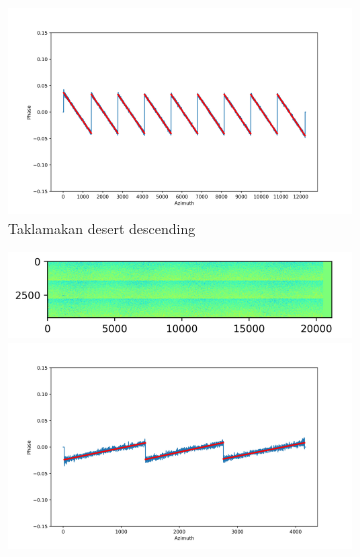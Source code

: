 \documentclass[preprint, authoryear]{elsarticle}
\begin{document}
\begin{figure}
\begin{subfigure}[c]{0.5\textwidth}
\begin{minipage}[c]{0.5\textwidth}
        \end{minipage}%
        \begin{minipage}[c]{0.5\textwidth}
            \centering
            \includegraphics[width=\textwidth]{figure/The cross-interferogram/cross_interf_TaklimakanDesert_des_row&fitted_20230108.png}
        \end{minipage}
        \caption{Taklamakan desert descending}
        \label{fig_5b}
    \end{subfigure}%
    \hfill
    \begin{subfigure}{0.5\textwidth}
        \centering
        \begin{minipage}{0.5\textwidth}
            \centering
            \includegraphics[width=\textwidth]{figure/The cross-interferogram/cross_interf_Mexico_asc.png}
        \end{minipage}%
        \begin{minipage}{0.5\textwidth}
            \centering
            \includegraphics[width=\textwidth]{figure/The cross-interferogram/cross_interf_Mexico_asc_row&fitted_20230104.png}

\end{minipage}
\end{subfigure}
\end{figure}
\end{document}
